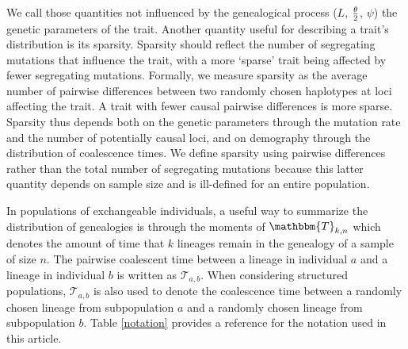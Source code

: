 We call those quantities not influenced by the genealogical process ($L$, $\frac{\theta}{2}$,
$\psi$) the genetic parameters of the trait. Another quantity useful for
describing a trait's distribution is its sparsity. Sparsity should reflect the
number of segregating mutations that influence the trait, with a more `sparse'
trait being affected by fewer segregating mutations. Formally, we measure
sparsity as the average number of pairwise differences between two randomly
chosen haplotypes at loci affecting the trait. A trait with fewer causal
pairwise differences is more sparse. Sparsity thus depends both on the genetic
parameters through the mutation rate and the number of potentially causal loci,
and on demography through the distribution of coalescence times. We define
sparsity using pairwise differences rather than the total number of segregating
mutations because this latter quantity depends on sample size and is ill-defined
for an entire population.

In populations of exchangeable individuals, a useful way to summarize the
distribution of genealogies is through the moments of $\mathbbm{T}_{k,n}$ which
denotes the amount of time that $k$ lineages remain in the genealogy of a sample
of size $n$. The pairwise coalescent time between a lineage in individual $a$
and a lineage in individual $b$ is written as $\mathcal{T}_{a,b}$. When
considering structured populations, $\mathcal{T}_{a,b}$ is also used to denote
the coalescence time between a randomly chosen lineage from subpopulation $a$
and a randomly chosen lineage from subpopulation $b$. Table \ref{notation}
provides a reference for the notation used in this article.

